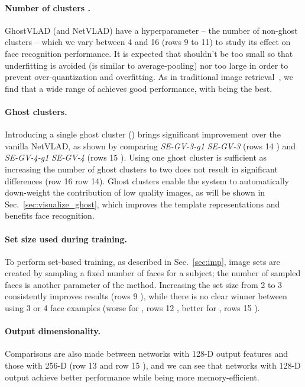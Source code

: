 \documentclass[runningheads]{llncs}
\begin{document}
\paragraph{Number of clusters .}
GhostVLAD (and NetVLAD) have a hyperparameter 
-- the number of non-ghost clusters -- which we vary
between 4 and 16 (rows 9 to 11) to study its effect on
face recognition performance.
It is expected that  shouldn't be too small
so that underfitting is avoided
(\eg  is similar to average-pooling)
nor too large in order to prevent over-quantization and overfitting.
As in traditional image retrieval~\cite{Jegou10},
we find that a wide range of  achieves good performance,
with  being the best.

\paragraph{Ghost clusters.}
Introducing a single ghost cluster () brings significant improvement
over the vanilla NetVLAD, as shown by comparing
\emph{SE-GV-3-g1} \vs \emph{SE-GV-3} (rows 14 )
and
\emph{SE-GV-4-g1} \vs \emph{SE-GV-4} (rows 15 ).
Using one ghost cluster is sufficient as
increasing the number of ghost clusters to two does not result in
significant differences (row 16 \vs row 14).
Ghost clusters enable the system to automatically down-weight
the contribution of low quality images, as will be shown in
Sec.~\ref{sec:visualize_ghost}, which improves the template representations
and benefits face recognition.

\paragraph{Set size used during training.}
To perform set-based training, as described in Sec.~\ref{sec:imp},
image sets are created by sampling a fixed number of faces for a subject;
the number of sampled faces is another parameter of the method.
Increasing the set size from 2 to 3 consistently improves results
(rows 9 ), while there is no clear winner between using
3 or 4 face examples (worse for , rows 12 ,
better for , rows 15 ).

\paragraph{Output dimensionality.}
Comparisons are also made between networks 
with 128-D output features and those with 256-D 
(\ie row 13  and row 15 ),
and we can see that networks with 128-D output achieve 
better performance while being more memory-efficient.
\end{document}
